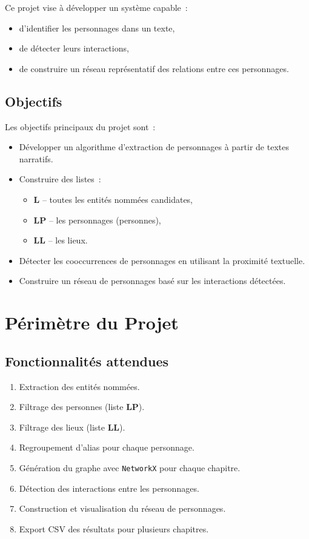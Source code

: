 \documentclass[12pt,a4paper]{article}
\begin{document}
Ce projet vise à développer un système capable~:
\begin{itemize}[noitemsep]
    \item d'identifier les personnages dans un texte,
    \item de détecter leurs interactions,
    \item de construire un réseau représentatif des relations entre ces personnages.
\end{itemize}

\subsection{Objectifs}

Les objectifs principaux du projet sont~:
\begin{itemize}
    \item Développer un algorithme d'extraction de personnages à partir de textes narratifs.
    \item Construire des listes~:
    \begin{itemize}
        \item \textbf{L} -- toutes les entités nommées candidates,
        \item \textbf{LP} -- les personnages (personnes),
        \item \textbf{LL} -- les lieux.
    \end{itemize}
    \item Détecter les cooccurrences de personnages en utilisant la proximité textuelle.
    \item Construire un réseau de personnages basé sur les interactions détectées.
\end{itemize}

\section{Périmètre du Projet}

\subsection{Fonctionnalités attendues}

\begin{enumerate}
    \item Extraction des entités nommées.
    \item Filtrage des personnes (liste \textbf{LP}).
    \item Filtrage des lieux (liste \textbf{LL}).
    \item Regroupement d'alias pour chaque personnage.
    \item Génération du graphe avec \texttt{NetworkX} pour chaque chapitre.
    \item Détection des interactions entre les personnages.
    \item Construction et visualisation du réseau de personnages.
    \item Export CSV des résultats pour plusieurs chapitres.
\end{enumerate}
\end{document}
